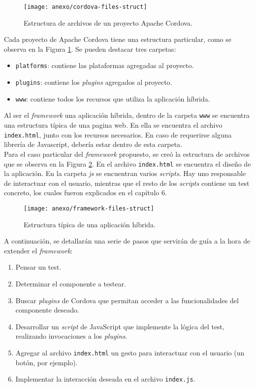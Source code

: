 \begin{figure}[hbtp]
    \centering
	\texttt{[image: anexo/cordova-files-struct]}
	\caption{Estructura de archivos de un proyecto Apache Cordova.}
    \label{fig:anexo:cordova-files-struct}
\end{figure}
Cada proyecto de Apache Cordova tiene una estructura particular, como se observa en la Figura \ref{fig:anexo:cordova-files-struct}. Se pueden destacar tres carpetas:
\begin{itemize}
\item \texttt{platforms}: contiene las plataformas agregadas al proyecto.
\item \texttt{plugins}: contiene los \emph{plugins} agregados al proyecto.
\item \texttt{www}: contiene todos los recursos que utiliza la aplicación híbrida.
\end{itemize}
Al ser el \emph{framework} una aplicación híbrida, dentro de la carpeta \texttt{www} se encuentra una estructura típica de una pagina web. En ella se encuentra el archivo \texttt{index.html}, junto con los recursos necesarios. En caso de requerirse alguna librería de Javascript, debería estar dentro de esta carpeta.\\

Para el caso particular del \emph{framework} propuesto, se creó la estructura de archivos que se observa en la Figura \ref{fig:anexo:framework-files-struct}. En el archivo \texttt{index.html} se encuentra el diseño de la aplicación. En la carpeta \emph{js} se encuentran varios \emph{scripts}. Hay uno responsable de interactuar con el usuario, mientras que el resto de los \emph{scripts} contiene un test concreto, los cuales fueron explicados en el capítulo 6.\\
\begin{figure}[htbp]
    \centering
	\texttt{[image: anexo/framework-files-struct]}
	\caption{Estructura típica de una aplicación híbrida.}
    \label{fig:anexo:framework-files-struct}
\end{figure}
\newpage
A continuación, se detallarán una serie de pasos que servirán de guía a la hora de extender el \emph{framework}:
\begin{enumerate}
\item Pensar un test.
\item Determinar el componente a testear.
\item Buscar \emph{plugins} de Cordova que permitan acceder a las funcionalidades del componente deseado.
\item Desarrollar un \emph{script} de JavaScript que implemente la lógica del test, realizando invocaciones a los \emph{plugins}.
\item Agregar al archivo \texttt{index.html} un gesto para interactuar con el usuario (un botón, por ejemplo).
\item Implementar la interacción deseada en el archivo \texttt{index.js}.
\end{enumerate}